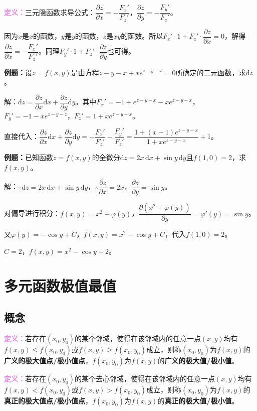 \documentclass[UTF8, 12pt]{ctexart}
\begin{document}
\textcolor{violet}{\textbf{定义：}}三元隐函数求导公式：$\dfrac{\partial z}{\partial x}=-\dfrac{F_x'}{F_z'}$，$\dfrac{\partial z}{\partial y}=-\dfrac{F_y'}{F_z'}$。

因为$x$是$x$的函数，$y$是$y$的函数，$z$是$xy$的函数。所以$F_x'\cdot1+F_z'\cdot\dfrac{\partial z}{\partial x}=0$，解得$\dfrac{\partial z}{\partial x}=-\dfrac{F_x'}{F_z'}$。同理$F_y'\cdot1+F_z'\cdot\dfrac{\partial z}{\partial y}$也可得。

\textbf{例题：}设$z=f(x,y)$是由方程$z-y-x+xe^{z-y-x}=0$所确定的二元函数，求$\textrm{d}z$。

解：$\textrm{d}z=\dfrac{\partial z}{\partial x}\textrm{d}x+\dfrac{\partial z}{\partial y}\textrm{d}y$。其中$F_x'=-1+e^{z-y-x}-xe^{z-y-x}$，$F_y'=-1-xe^{z-y-z}$，$F_z'=1+xe^{z-y-x}$。

直接代入：$\dfrac{\partial z}{\partial x}\textrm{d}x+\dfrac{\partial z}{\partial y}\textrm{d}y=-\dfrac{F_x'}{F_z'}-\dfrac{F_y'}{F_z'}=\dfrac{1+(x-1)e^{z-y-x}}{1+xe^{z-y-x}}+1$。

\textbf{例题：}已知函数$z=f(x,y)$的全微分$\textrm{d}z=2x\,\textrm{d}x+\sin y\,\textrm{d}y$且$f(1,0)=2$，求$f(x,y)$。

解：$\because\textrm{d}z=2x\,\textrm{d}x+\sin y\,\textrm{d}y$，$\therefore\dfrac{\partial z}{\partial x}=2x$，$\dfrac{\partial z}{\partial y}=\sin y$。

对偏导进行积分：$f(x,y)=x^2+\varphi(y)$，$\dfrac{\partial(x^2+\varphi(y))}{\partial y}=\varphi'(y)=\sin y$。

又$\varphi(y)=-\cos y+C$，$f(x,y)=x^2-\cos y+C$，代入$f(1,0)=2$。

$C=2$，$f(x,y)=x^2-\cos y+2$。

\section{多元函数极值最值}

\subsection{概念}

\textcolor{violet}{\textbf{定义：}}若存在$(x_0,y_0)$的某个邻域，使得在该邻域内的任意一点$(x,y)$均有$f(x,y)\leqslant f(x_0,y_0)$或$f(x,y)\geqslant f(x_0,y_0)$成立，则称$(x_0,y_0)$为$f(x,y)$的\textbf{广义的极大值点/极小值点}，$f(x_0,y_0)$为$f(x,y)$的\textbf{广义的极大值/极小值}。

\textcolor{violet}{\textbf{定义：}}若存在$(x_0,y_0)$的某个去心邻域，使得在该邻域内的任意一点$(x,y)$均有$f(x,y)<f(x_0,y_0)$或$f(x,y)>f(x_0,y_0)$成立，则称$(x_0,y_0)$为$f(x,y)$的\textbf{真正的极大值点/极小值点}，$f(x_0,y_0)$为$f(x,y)$的\textbf{真正的极大值/极小值}。
\end{document}
